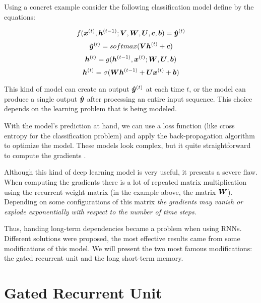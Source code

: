 Using a concret example consider the following classification model define by the equations:

\begin{equation}
f(\bm{x}^{(t)}, \bm{h}^{(t-1)}; \bm{V}, \bm{W}, \bm{U}, \bm{c}, \bm{b}) = \bm{\hat{y}}^{(t)}
\end{equation}
 \vspace{0.2cm}
\begin{equation}
\bm{\hat{y}}^{(t)} = softmax(\bm{V} \bm{h}^{(t)} + \bm{c})
\end{equation}
\vspace{0.2cm}
 \begin{equation}
\bm{h}^{(t)} = g(\bm{h}^{(t-1)}, \bm{x}^{(t)}; \bm{W},\bm{U}, \bm{b})
\end{equation}
\vspace{0.2cm}
\begin{equation}
\bm{h}^{(t)} = \sigma(\bm{W} \bm{h}^{(t-1)} + \bm{U} \bm{x}^{(t)} + \bm{b})
\end{equation}

This kind of model can create an output $\bm{\hat{y}}^{(t)}$ at each time $t$, or the model can produce a single output $\bm{\hat{y}}$ after processing an entire input sequence. This choice depends on the learning problem that is being modeled.

With the model's prediction at hand, we can use a loss function (like cross entropy for the classification problem) and apply the back-propagation algorithm to optimize the model. These models look complex, but it quite straightforward to compute the gradients \cite[p.~374]{DeepLearningbook}.

Although this kind of deep learning model is very useful, it presents a severe flaw. When computing the gradients there is a lot of repeated matrix multiplication using the recurrent weight matrix (in the example above, the matrix $\bm{W}$). Depending on some configurations of this matrix \textit{the gradients may vanish or explode exponentially with respect to the number of time steps}.

Thus, handing long-term dependencies became a problem when using RNNs. Different solutions were proposed, the most effective results came from some modifications of this model. We will present the two most famous modifications: the gated recurrent unit and the long short-term memory. 

\section{Gated Recurrent Unit}
\label{sec:GRU}


